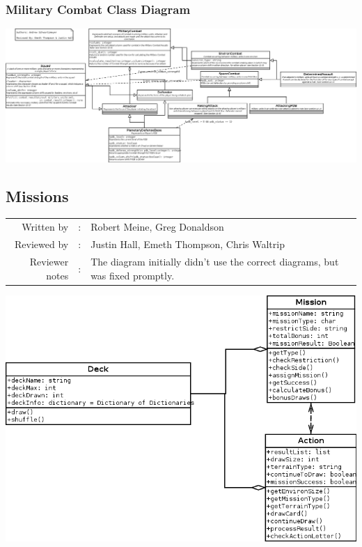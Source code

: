 \documentclass[12pt,letterpaper]{article}
\begin{document}
		\pagebreak
		\subsubsection{Military Combat Class Diagram}
		\includegraphics[width=\textwidth,height=\textheight,keepaspectratio]{./images/military_combat}
		
		\pagebreak
	\subsection{Missions}
	\begin{tabularx}{\linewidth}{rcX}
				Written by & : & Robert Meine, Greg Donaldson \\
				Reviewed by & : & Justin Hall, Emeth Thompson, Chris Waltrip \\
				Reviewer notes & : & The diagram initially didn't use the correct diagrams, but was fixed promptly. 
	\end{tabularx}
		\includegraphics[width=\textwidth,height=\textheight,keepaspectratio]{./images/missions}
			\pagebreak
\end{document}
